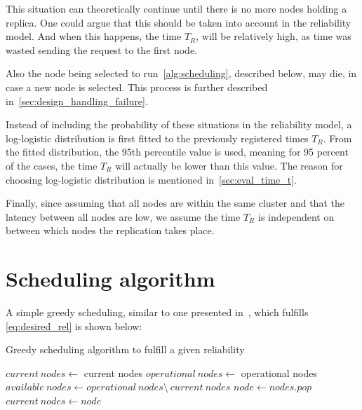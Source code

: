 \documentclass{cslthse-msc}
\begin{document}
This situation can theoretically continue until there is no more nodes holding a replica. One could argue that this should be taken into account in the reliability model. And when this happens, the time $T_R$, will be relatively high, as time was wasted sending the request to the first node. 

Also the node being selected to run~\cref{alg:scheduling}, described below, may die, in case a new node is selected. This process is further described in~\cref{sec:design_handling_failure}.

Instead of including the probability of these situations in the reliability model, a log-logistic distribution is first fitted to the previously registered times $T_R$. From the fitted distribution, the 95th percentile value is used, meaning for 95 percent of the cases, the time $T_R$ will actually be lower than this value. The reason for choosing log-logistic distribution is mentioned in~\cref{sec:eval_time_t}.

Finally, since assuming that all nodes are within the same cluster and that the latency between all nodes are low, we assume the time $T_R$ is independent on between which nodes the replication takes place. 


\section{Scheduling algorithm} \label{sec:design_sched_alg}
A simple greedy scheduling, similar to one presented in~\cite{effTaskReplMobGrid}, which fulfills \cref{eq:desired_rel} is shown below:


\begin{algorithm}[H]
	\caption{Greedy scheduling algorithm to fulfill a given reliability} \label{alg:scheduling}
	\begin{algorithmic}[1]
	\Statex
	\State $current\ nodes\gets$ current nodes
	\State $operational\ nodes\gets $ operational nodes
	\State $available\ nodes\gets operational\ nodes \setminus \ current\ nodes$
	\State
		\State $node\gets nodes.pop$
		\State
		\State $current\ nodes\gets node$
	\EndWhile
	\EndProcedure
	\end{algorithmic}
\end{algorithm} 
\end{document}
